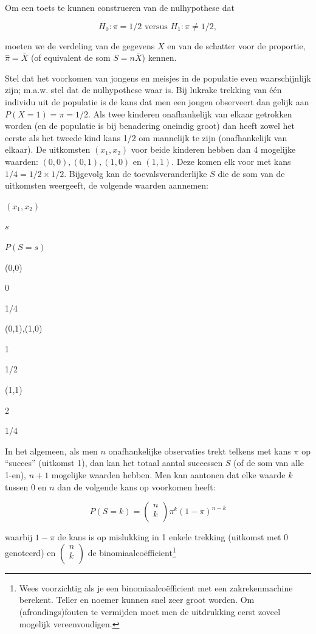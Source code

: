 \documentclass[
  12pt,dutch]{book}
\theoremstyle{definition}
\theoremstyle{definition}
\theoremstyle{definition}
\theoremstyle{definition}
\theoremstyle{remark}
\begin{document}
Om een toets te kunnen construeren van de nulhypothese
dat

\[H_0: \pi=1/2 \text{ versus } H_1: \pi\neq 1/2,\]

moeten we de verdeling van de
gegevens \(X\) en van de schatter voor de proportie, \(\hat \pi = \bar X\) (of equivalent de som \(S=n\bar X\)) kennen.

Stel dat het voorkomen van jongens en meisjes in de populatie even waarschijnlijk zijn; m.a.w. stel dat de nulhypothese waar is. Bij lukrake trekking
van één individu uit de populatie is de kans dat men een jongen observeert dan gelijk aan \(P(X=1) = \pi = 1/2.\)
Als twee kinderen onafhankelijk van elkaar getrokken worden (en de populatie is bij benadering oneindig groot) dan heeft zowel
het eerste als het tweede kind kans 1/2 om mannelijk te zijn
(onafhankelijk van elkaar). De uitkomsten \((x_1, x_2)\) voor beide kinderen
hebben dan 4 mogelijke waarden: \((0,0), (0,1),(1,0)\) en \((1,1).\) Deze komen
elk voor met kans \(1/4 = 1/2 \times 1/2\). Bijgevolg kan de
toevalsveranderlijke \(S\) die de som van de uitkomsten weergeeft, de
volgende waarden aannemen:

\((x_1,x_2)\)

\(s\)

\(P(S=s)\)

(0,0)

0

1/4

(0,1),(1,0)

1

1/2

(1,1)

2

1/4

In het algemeen, als men \(n\) onafhankelijke observaties trekt telkens met kans \(\pi\) op ``succes'' (uitkomst 1), dan kan het totaal aantal successen
\(S\) (of de som van alle 1-en), \(n+1\) mogelijke waarden hebben. Men kan
aantonen dat elke waarde \(k\) tussen 0 en \(n\) dan de volgende kans op
voorkomen heeft:

\begin{equation}
P(S=k) = \left (
\begin{array}{c}
n \\
k \\
\end{array}
\right ) \pi^k (1-\pi)^{n-k}  \label{eq:binomk}
\end{equation}

waarbij \(1-\pi\) de kans is op mislukking in 1 enkele trekking (uitkomst met 0 genoteerd) en
\(\left(\begin{array}{c}
n \\
k \\
\end{array}\right)\) de binomiaalcoëfficient\footnote{Wees voorzichtig als je een binomiaalcoëfficient met een zakrekenmachine
  berekent. Teller en noemer kunnen snel zeer groot worden. Om (afrondings)fouten te vermijden moet men de uitdrukking eerst zoveel
  mogelijk vereenvoudigen.}
\end{document}
